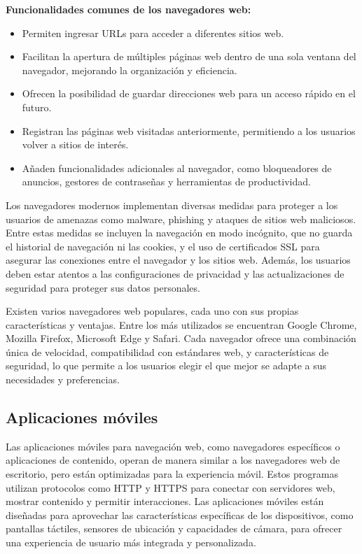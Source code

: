 \documentclass[12pt]{article}
\begin{document}
                        \textbf{Funcionalidades comunes de los navegadores web:}

                        \begin{itemize}
                                \item Permiten ingresar URLs para acceder a diferentes sitios web.
                                \item Facilitan la apertura de múltiples páginas web dentro de una sola ventana del navegador, mejorando la organización y eficiencia.
                                \item Ofrecen la posibilidad de guardar direcciones web para un acceso rápido en el futuro.
                                \item Registran las páginas web visitadas anteriormente, permitiendo a los usuarios volver a sitios de interés.
                                \item Añaden funcionalidades adicionales al navegador, como bloqueadores de anuncios, gestores de contraseñas y herramientas de productividad.
                        \end{itemize}

                        Los navegadores modernos implementan diversas medidas para proteger a los usuarios de amenazas como malware, phishing y ataques de sitios web maliciosos. Entre estas medidas se incluyen la navegación en modo incógnito, que no guarda el historial de navegación ni las cookies, y el uso de certificados SSL para asegurar las conexiones entre el navegador y los sitios web. Además, los usuarios deben estar atentos a las configuraciones de privacidad y las actualizaciones de seguridad para proteger sus datos personales.

                        Existen varios navegadores web populares, cada uno con sus propias características y ventajas. Entre los más utilizados se encuentran Google Chrome, Mozilla Firefox, Microsoft Edge y Safari. Cada navegador ofrece una combinación única de velocidad, compatibilidad con estándares web, y características de seguridad, lo que permite a los usuarios elegir el que mejor se adapte a sus necesidades y preferencias.

                \subsection{Aplicaciones móviles}
                        Las aplicaciones móviles para navegación web, como navegadores específicos o aplicaciones de contenido, operan de manera similar a los navegadores web de escritorio, pero están optimizadas para la experiencia móvil. Estos programas utilizan protocolos como HTTP y HTTPS para conectar con servidores web, mostrar contenido y permitir interacciones. Las aplicaciones móviles están diseñadas para aprovechar las características específicas de los dispositivos, como pantallas táctiles, sensores de ubicación y capacidades de cámara, para ofrecer una experiencia de usuario más integrada y personalizada.
\end{document}

